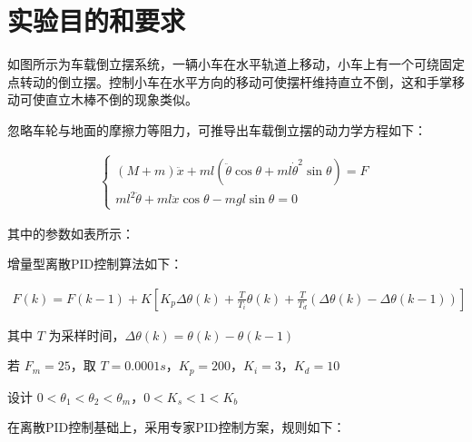 \documentclass[12pt,a4paper,UTF8]{article}
\begin{document}

\maketoc    %
\section{实验目的和要求}
如图所示为车载倒立摆系统，一辆小车在水平轨道上移动，小车上有一个可绕固定点转动的倒立摆。控制小车在水平方向的移动可使摆杆维持直立不倒，这和手掌移动可使直立木棒不倒的现象类似。

忽略车轮与地面的摩擦力等阻力，可推导出车载倒立摆的动力学方程如下：

\begin{align}
\begin{cases}
(M + m) \ddot{x} + m l (\ddot{\theta} \cos \theta + ml \dot{\theta}^2 \sin \theta) = F \\
ml^2 \ddot{\theta} + ml \ddot{x} \cos \theta - mgl \sin \theta = 0
\end{cases}    
\end{align}



其中的参数如表所示：


增量型离散PID控制算法如下：

\begin{align*}
   F(k) = F(k-1) + K \left[ K_p \Delta \theta (k) + \frac{T}{T_i} \theta (k) + \frac{T}{T_d} (\Delta \theta (k) - \Delta \theta (k-1)) \right] 
\end{align*}


其中 $T$ 为采样时间，$\Delta \theta (k) = \theta (k) - \theta (k-1)$

若 $F_m = 25$，取 $T = 0.0001s$，$K_p = 200$，$K_i = 3$，$K_d = 10$

设计 $0 < \theta_1 < \theta_2 < \theta_m$，$0 < K_s < 1 < K_b$


在离散PID控制基础上，采用专家PID控制方案，规则如下：
\end{document}
